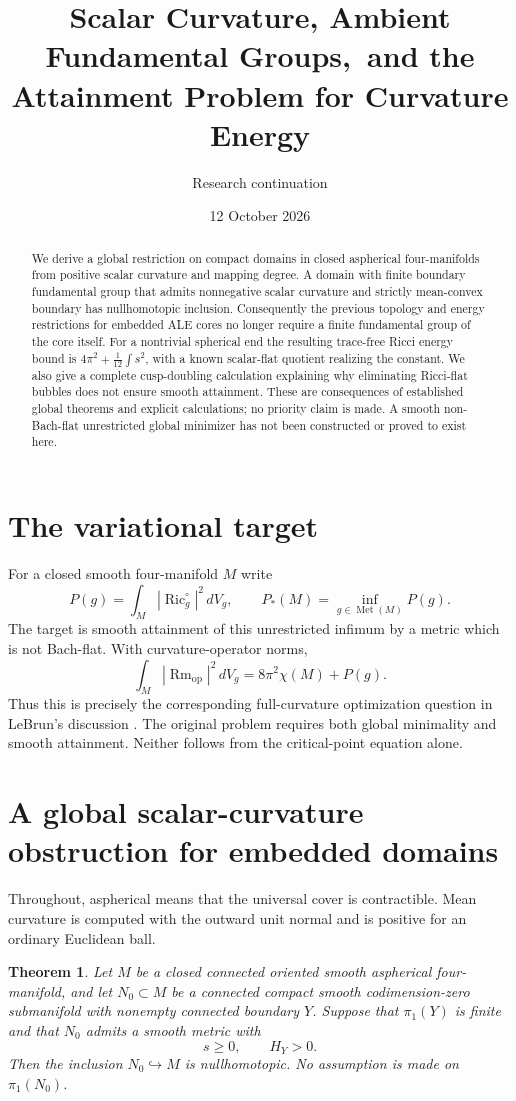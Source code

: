 \documentclass[11pt]{article}
\title{Scalar Curvature, Ambient Fundamental Groups,\ and the Attainment Problem for Curvature Energy}
\author{Research continuation}
\date{12 October 2026}
\newtheorem{theorem}{Theorem}
\DeclareMathOperator{\Ric}{Ric}
\begin{document}
\maketitle
\begin{abstract}
We derive a global restriction on compact domains in closed aspherical
four-manifolds from positive scalar curvature and mapping degree. A domain
with finite boundary fundamental group that admits nonnegative scalar
curvature and strictly mean-convex boundary has nullhomotopic inclusion.
Consequently the previous topology and energy restrictions for embedded
ALE cores no longer require a finite fundamental group of the core itself.
For a nontrivial spherical end the resulting trace-free Ricci energy bound
is $4\pi^2+\frac1{12}\int s^2$, with a known scalar-flat quotient realizing
the constant. We also give a complete cusp-doubling calculation explaining
why eliminating Ricci-flat bubbles does not ensure smooth attainment.
These are consequences of established global theorems and explicit
calculations; no priority claim is made. A smooth non-Bach-flat unrestricted
global minimizer has not been constructed or proved to exist here.
\end{abstract}

\section{The variational target}
For a closed smooth four-manifold $M$ write
\[
 P(g)=\int_M|\Ric_g^{\circ}|^2\,dV_g,
 \qquad P_*(M)=\inf_{g\in\operatorname{Met}(M)}P(g).
\]
The target is smooth attainment of this unrestricted infimum by a metric
which is not Bach-flat. With curvature-operator norms,
\[
 \int_M|\operatorname{Rm}_{\mathrm{op}}|^2\,dV_g
 =8\pi^2\chi(M)+P(g).
\]
Thus this is precisely the corresponding full-curvature optimization
question in LeBrun's discussion \cite[Section 11]{LeBrun04}.
The original problem requires both global minimality and smooth attainment.
Neither follows from the critical-point equation alone.

\section{A global scalar-curvature obstruction for embedded domains}
Throughout, aspherical means that the universal cover is contractible.
Mean curvature is computed with the outward unit normal and is positive
for an ordinary Euclidean ball.

\begin{theorem}\label{thm:domain}
Let $M$ be a closed connected oriented smooth aspherical four-manifold,
and let $N_0\subset M$ be a connected compact smooth codimension-zero
submanifold with nonempty connected boundary $Y$.
Suppose that $\pi_1(Y)$ is finite and that $N_0$ admits a smooth metric with
\[
 s\ge0,\qquad H_Y>0.
\]
Then the inclusion $N_0\hookrightarrow M$ is nullhomotopic.
No assumption is made on $\pi_1(N_0)$.
\end{theorem}
\end{document}
